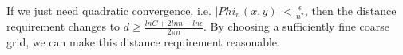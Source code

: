 \documentclass[12pt]{article}
\begin{document}

If we just need quadratic convergence, i.e. $|Phi_n(x, y)| < \frac{\epsilon}{n^2}$, then the distance requirement changes to $d \geq \frac{lnC + 2lnn - ln\epsilon}{2 \pi n}$. By choosing a sufficiently fine coarse grid, we can make this distance requirement reasonable. 



    





{\footnotesize



}
\end{document}
